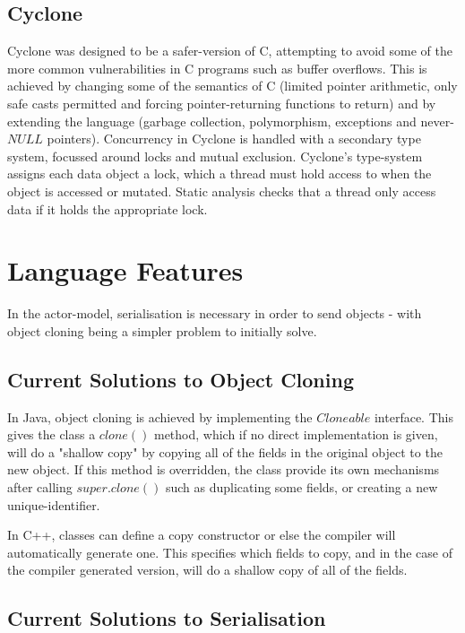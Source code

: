 \documentclass[11pt,a4paper]{report}
\begin{document}
\subsection{Cyclone}
\label{sec:cyclone}

Cyclone\cite{grossman2005cyclone} was designed to be a safer-version of C, attempting to avoid some of the more common vulnerabilities in C programs such as buffer overflows.
This is achieved by changing some of the semantics of C (limited pointer arithmetic, only safe casts permitted and forcing pointer-returning functions to return) and by extending the language (garbage collection, polymorphism, exceptions and never-$NULL$ pointers).
Concurrency in Cyclone is handled with a secondary type system, focussed around locks and mutual exclusion.
Cyclone's type-system assigns each data object a lock, which a thread must hold access to when the object is accessed or mutated.
Static analysis checks that a thread only access data if it holds the appropriate lock.

\newpage
\section{Language Features}

In the actor-model, serialisation is necessary in order to send objects - with object cloning being a simpler problem to initially solve.
 
\subsection{Current Solutions to Object Cloning}

In Java, object cloning is achieved by implementing the $Cloneable$ interface\cite{java-cloneable}. This gives the class a $clone()$ method, which if no direct implementation is given, will do a "shallow copy" by copying all of the fields in the original object to the new object.
If this method is overridden, the class provide its own mechanisms after calling $super.clone()$ such as duplicating some fields, or creating a new unique-identifier.

In C++, classes can define a copy constructor or else the compiler will automatically generate one\cite{ansi:03:c++}. This specifies which fields to copy, and in the case of the compiler generated version, will do a shallow copy of all of the fields.

\subsection{Current Solutions to Serialisation}
\end{document}
